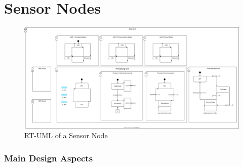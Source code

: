 \section{Sensor Nodes}

\begin{figure}[ht!]
   \centering
   \includegraphics[width=\textwidth]{../../assets/diagrams/edge_node_rtuml/edge_node_rtuml.png}
   \hfill
   \caption{RT-UML of a Sensor Node}
   \label{fig:rt_uml_sensor_node}
\end{figure}

\subsubsection{Main Design Aspects}


